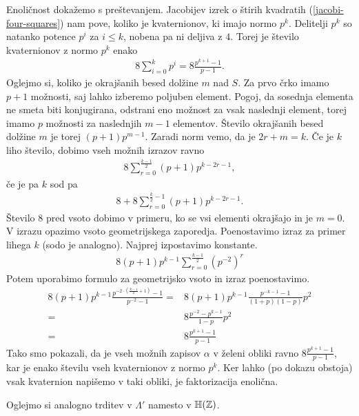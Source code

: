\begin{dokaz}
    Enoličnost dokažemo s preštevanjem. Jacobijev izrek o štirih kvadratih (\ref{jacobi-four-squares}) nam pove, koliko je kvaternionov, ki imajo normo \(p^k\). Delitelji \(p^k\) so natanko potence \(p^i\) za \(i\leq k\), nobena pa ni deljiva z \(4\). Torej je število kvaternionov z normo \(p^k\) enako 
    \begin{align*}
        8\sum_{i=0}^k p^i = 8\frac{p^{k+1}-1}{p-1}.
    \end{align*}
    Oglejmo si, koliko je okrajšanih besed dolžine \(m\) nad \(S\). Za prvo črko imamo \(p+1\) možnosti, saj lahko izberemo poljuben element. Pogoj, da sosednja elementa ne smeta biti konjugirana, odstrani eno možnost za vsak naslednji element, torej imamo \(p\) možnosti za naslednjih \(m-1\) elementov. Število okrajšanih besed dolžine \(m\) je torej \((p+1)p^{m-1}\). Zaradi norm vemo, da je \(2r+m=k\). Če je \(k\) liho število, dobimo vseh možnih izrazov ravno
    \begin{align*}
        8\sum_{r=0}^{\frac{k-1}{2}} (p+1)p^{k-2r-1},
    \end{align*} 
    če je pa \(k\) sod pa
    \begin{align*}
        8+8\sum_{r=0}^{\frac{k}{2}-1} (p+1)p^{k-2r-1}.
    \end{align*}
    Število \(8\) pred vsoto dobimo v primeru, ko se vsi elementi okrajšajo in je \(m=0\). V izrazu opazimo vsoto geometrijskega zaporedja. Poenostavimo izraz za primer lihega \(k\) (sodo je analogno). Najprej izpostavimo konstante.
    \begin{align*}
        8(p+1)p^{k-1}\sum_{r=0}^{\frac{k-1}{2}} \left(p^{-2}\right)^r
    \end{align*}
    Potem uporabimo formulo za geometrijsko vsoto in izraz poenostavimo.
    \begin{align*}
        8(p+1)p^{k-1} \frac{p^{-2\cdot \left(\frac{k-1}{2}+1\right)}-1}{p^{-2}-1}
        =& 8(p+1)p^{k-1} \frac{p^{-k-1}-1}{(1+p)(1-p)} p^2\\
        =& 8\frac{p^{-2} - p^{k-1}}{1-p} p^2\\
        =& 8\frac{p^{k+1} - 1}{p-1}
    \end{align*}
    Tako smo pokazali, da je vseh možnih zapisov \(\alpha\) v želeni obliki ravno \(8\frac{p^{k+1}-1}{p-1}\), kar je enako številu vseh kvaternionov z normo \(p^k\). Ker lahko (po dokazu obstoja) vsak kvaternion napišemo v taki obliki, je faktorizacija enolična.
\end{dokaz}
Oglejmo si analogno trditev v \(\Lambda'\) namesto v \(\mathbb H(\mathbb Z)\).
